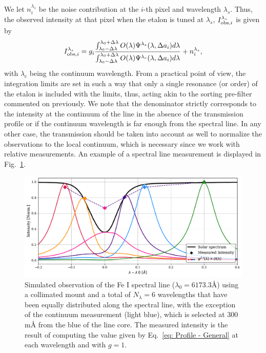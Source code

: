 We let $n _ i ^{\lambda_s}$ be the  noise contribution at the $i$-th pixel and wavelength $\lambda_s$. Thus, the observed intensity at that pixel when the etalon is tuned at $\lambda _s$, $I ^{\lambda _ s} _ {{\rm obs}, i}$ is given by 
\begin{equation}
I ^{\lambda _ s} _ {{\rm obs}, i} = g_i \frac{\int_{\lambda_0 - \Delta \lambda}^{\lambda_0 + \Delta \lambda} O(\lambda)\Psi^{\lambda _ s} (\lambda , \Delta a _i)  d\lambda}{\int_{\lambda_0 - \Delta \lambda}^{\lambda_0 + \Delta \lambda} O(\lambda)\Psi^{\lambda _ c} (\lambda, \Delta a _ i)  d\lambda} + n _ i ^{\lambda_s}    ,
\label{eq: Profile - General}
\end{equation}
with $\lambda _ c$ being the continuum wavelength. From a practical point of view, the integration limits are set in such a way that only a single resonance (or order) of the etalon is included with the limits, thus, acting akin to the sorting pre-filter commented on previously. We note that the denominator strictly corresponds to the intensity at the continuum of the line in the absence of the transmission profile or if the continuum wavelength is far enough from the spectral line. In any other case, the transmission should be taken into account as well to normalize the observations to the local continuum, which is necessary since we work with relative measurements. An example of a spectral line measurement is displayed in Fig.~\ref{fig_etalon_corr: Prof-Measure}.
\begin{figure}
    \centering
    \includegraphics[width = \textwidth]{figures/EtalonPaper/ProfileMeasurement.pdf}
    \caption{Simulated observation of the Fe I spectral line ($\lambda _ 0 = 6173.3$\r{A}) using a collimated mount and a total of $N_ \lambda = 6$ wavelengths that have been equally distributed along the spectral line, with the exception of the continuum measurement (light blue), which is selected at $300$ m\r{A} from the blue of the line core. The measured intensity is the result of computing the value given by Eq.~\ref{eq: Profile - General} at each wavelength and with $g = 1$.
    } \label{fig_etalon_corr: Prof-Measure}
\end{figure}

